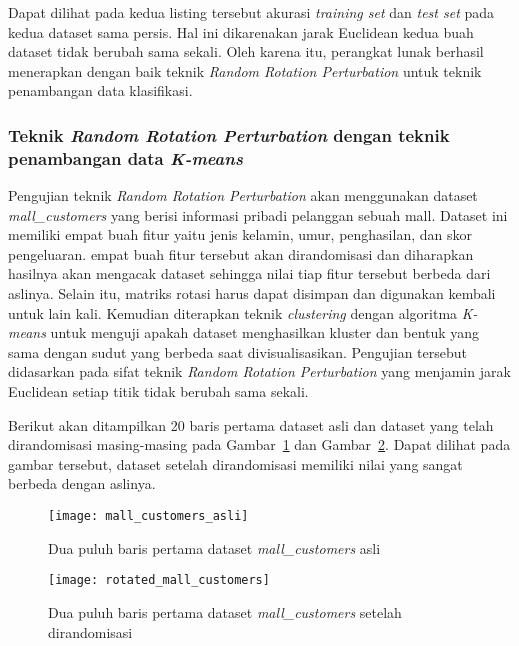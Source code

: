 Dapat dilihat pada kedua listing tersebut akurasi \textit{training set} dan \textit{test set} pada kedua dataset sama persis. Hal ini dikarenakan jarak Euclidean kedua buah dataset tidak berubah sama sekali. Oleh karena itu, perangkat lunak berhasil menerapkan dengan baik teknik \textit{Random Rotation Perturbation} untuk teknik penambangan data klasifikasi.

\subsubsection{Teknik \textit{Random Rotation Perturbation} dengan teknik penambangan data \textit{K-means}}
\label{sec:rrp-kmeans}

Pengujian teknik \textit{Random Rotation Perturbation} akan menggunakan dataset \textit{mall\_customers} yang berisi informasi pribadi pelanggan sebuah mall. Dataset ini memiliki empat buah fitur yaitu jenis kelamin, umur, penghasilan, dan skor pengeluaran. empat buah fitur tersebut akan dirandomisasi dan diharapkan hasilnya akan mengacak dataset sehingga nilai tiap fitur tersebut berbeda dari aslinya. Selain itu, matriks rotasi harus dapat disimpan dan digunakan kembali untuk lain kali. Kemudian diterapkan teknik \textit{clustering} dengan algoritma \textit{K-means} untuk menguji apakah dataset menghasilkan kluster dan bentuk yang sama dengan sudut yang berbeda saat divisualisasikan. Pengujian tersebut didasarkan pada sifat teknik \textit{Random Rotation Perturbation} yang menjamin jarak Euclidean setiap titik tidak berubah sama sekali.

Berikut akan ditampilkan 20 baris pertama dataset asli dan dataset yang telah dirandomisasi masing-masing pada Gambar~\ref{fig:mall_customers_asli} dan Gambar~\ref{fig:rotated_mall_customers}. Dapat dilihat pada gambar tersebut, dataset setelah dirandomisasi memiliki nilai yang sangat berbeda dengan aslinya.

\begin{figure}
	\centering
	\texttt{[image: mall\_customers\_asli]}
	\caption{Dua puluh baris pertama dataset \textit{mall\_customers} asli}
	\label{fig:mall_customers_asli}
\end{figure}

\begin{figure}
	\centering
	\texttt{[image: rotated\_mall\_customers]}
	\caption{Dua puluh baris pertama dataset \textit{mall\_customers} setelah dirandomisasi}
	\label{fig:rotated_mall_customers}
\end{figure}

